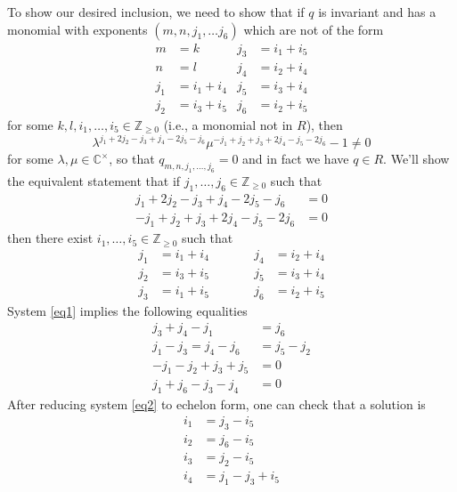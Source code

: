 \documentclass[12pt]{amsart}
\newcommand{\C}{\mathbb{C}}
\theoremstyle{remark}
\theoremstyle{remark}
\begin{document}
To show our desired inclusion, we need to show that if $q$ is invariant and has a monomial with exponents $(m, n, j_1, \ldots j_6)$ which are not of the form
\begin{align*}
	m &= k & j_3 &= i_1 + i_5 \\
	n &= l & j_4 &= i_2 + i_4 \\
	j_1 &= i_1 + i_4 & j_5 &= i_3 + i_4 \\
	j_2 &= i_3 + i_5 & j_6 &= i_2 + i_5
\end{align*}
for some $k, l, i_1, \ldots, i_5 \in \mathbb{Z}_{\ge 0}$ (i.e., a monomial not in $R$), then 
$$\lambda^{j_1 + 2j_2 - j_3 + j_4 -2 j_5 - j_6} \mu^{- j_1 +j_2 +j_3 + 2 j_4 - j_5 -2 j_6}  - 1 \ne 0$$
for some $\lambda, \mu \in \C^\times$, so that $q_{m, n, j_1, \ldots, j_6} = 0$ and in fact we have $q \in R$.
We'll show the equivalent statement that if $j_1, \ldots, j_6 \in \mathbb{Z}_{\ge 0}$ such that
\begin{equation}
\begin{aligned}
	j_1 + 2j_2 - j_3 + j_4 -2 j_5 - j_6 &= 0 \\
	- j_1 +j_2 +j_3 + 2 j_4 - j_5 -2 j_6 &= 0
\end{aligned}
\label{eq1}
\end{equation}
then there exist $i_1, \ldots, i_5 \in \mathbb{Z}_{\ge 0}$ such that 
\begin{equation}
\begin{aligned}
	j_1 &= i_1 + i_4  & \qquad & j_4 &= i_2 + i_4 \\
	j_2 &= i_3 + i_5 & \qquad & j_5 &= i_3 + i_4 \\
	j_3 &= i_1 + i_5 & \qquad & j_6 &= i_2 + i_5
\end{aligned}
\label{eq2}
\end{equation}
System \ref{eq1} implies the following equalities
\begin{align*}
	j_3 + j_4 - j_1 &= j_6 \\
	j_1 - j_3 = j_4 - j_6 &= j_5 - j_2 \\
	- j_1 - j_2 + j_3 + j_5 &= 0 \\
	j_1 + j_6 - j_3 - j_4 &= 0
\end{align*}
After reducing system \ref{eq2} to echelon form, one can check that a solution is
\begin{align*}
	i_1 &= j_3 - i_5 \\
	i_2 &= j_6 - i_5 \\
	i_3 &= j_2 - i_5 \\
	i_4 &= j_1 - j_3 + i_5
\end{align*}
\end{document}
